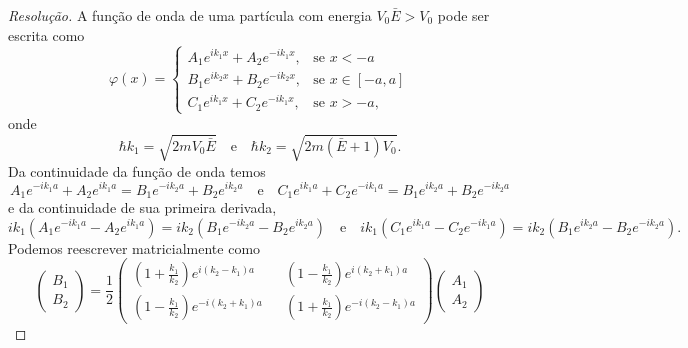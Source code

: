 \begin{proof}[Resolução]
    A função de onda de uma partícula com energia \(V_0 \bar{E} > V_0\) pode ser escrita como
    \begin{equation*}
        \varphi(x) = \begin{cases}
            A_1 e^{i k_1 x} + A_2 e^{-i k_1 x},&\text{se }x < -a\\
            B_1 e^{i k_2 x} + B_2 e^{-i k_2 x},&\text{se }x \in [-a,a]\\
            C_1 e^{i k_1 x} + C_2 e^{-i k_1 x},&\text{se }x > -a,
        \end{cases}
    \end{equation*}
    onde
    \begin{equation*}
        \hbar k_1 = \sqrt{2m V_0 \bar{E}} \quad\text{e}\quad \hbar k_2 = \sqrt{2 m (\bar{E} + 1)V_0}.
    \end{equation*}
    Da continuidade da função de onda temos
    \begin{equation*}
        A_1 e^{-i k_1 a} + A_2 e^{ik_1 a} = B_1 e^{-ik_2 a} + B_2 e^{ik_2 a}
        \quad\text{e}\quad
        C_1 e^{i k_1 a} + C_2 e^{-ik_1 a} = B_1 e^{ik_2 a} + B_2 e^{-ik_2 a}
    \end{equation*}
    e da continuidade de sua primeira derivada,
    \begin{equation*}
        ik_1(A_1 e^{-i k_1 a} - A_2 e^{ik_1 a}) = ik_2(B_1 e^{-ik_2 a} - B_2 e^{ik_2 a})
        \quad\text{e}\quad
        ik_1(C_1 e^{i k_1 a} - C_2 e^{-ik_1 a}) = ik_2(B_1 e^{ik_2 a} - B_2 e^{-ik_2 a}).
    \end{equation*}
    Podemos reescrever matricialmente como
    \begin{equation*}
        \begin{pmatrix}
            B_1 \\
            B_2
        \end{pmatrix} = \frac12
        \begin{pmatrix}
            \left(1 + \frac{k_1}{k_2}\right)e^{i(k_2 - k_1)a} &&
            \left(1 - \frac{k_1}{k_2}\right)e^{i(k_2 + k_1)a} \\
            \left(1 - \frac{k_1}{k_2}\right)e^{-i(k_2 + k_1)a} &&
            \left(1 + \frac{k_1}{k_2}\right)e^{-i(k_2 - k_1)a}
        \end{pmatrix}
        \begin{pmatrix}
            A_1\\
            A_2
        \end{pmatrix}
    \end{equation*}

\end{proof}
